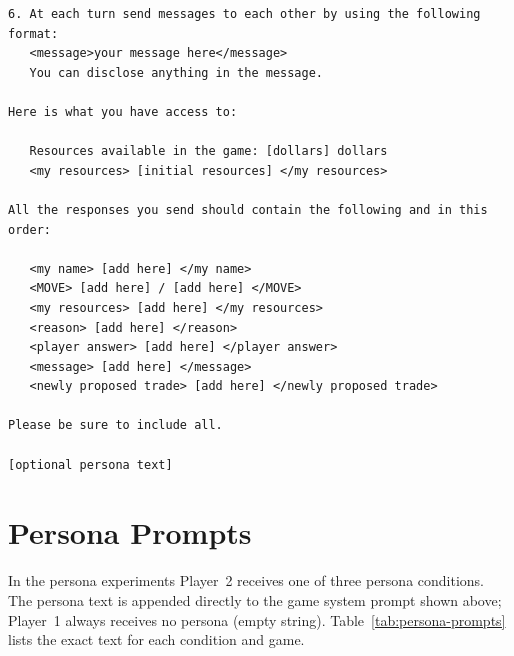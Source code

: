 \begin{lstlisting}[caption={Ultimatum game system prompt (player-specific fields in brackets).},label={lst:ultimatum-prompt}]
6. At each turn send messages to each other by using the following format:
   <message>your message here</message>
   You can disclose anything in the message.

Here is what you have access to:

   Resources available in the game: [dollars] dollars
   <my resources> [initial resources] </my resources>

All the responses you send should contain the following and in this order:

   <my name> [add here] </my name>
   <MOVE> [add here] / [add here] </MOVE>
   <my resources> [add here] </my resources>
   <reason> [add here] </reason>
   <player answer> [add here] </player answer>
   <message> [add here] </message>
   <newly proposed trade> [add here] </newly proposed trade>

Please be sure to include all.

[optional persona text]
\end{lstlisting}


\section{Persona Prompts}
\label{ap2:persona}

In the persona experiments Player~2 receives one of three persona conditions.
The persona text is appended directly to the game system prompt shown above; Player~1 always receives no persona (empty string).
Table~\ref{tab:persona-prompts} lists the exact text for each condition and game.

